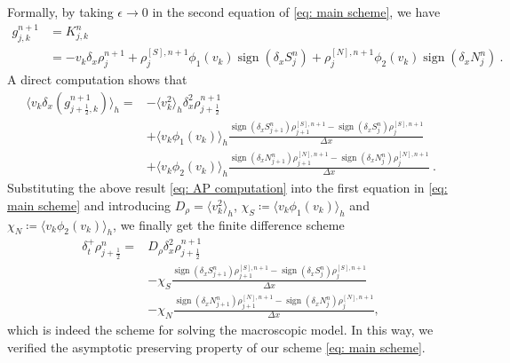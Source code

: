 \documentclass[11pt,twoside]{article}
\theoremstyle{nonumberplain}
\DeclareMathOperator{\sign}{sign}
\begin{document}
{Formally, by taking $\epsilon\to0$ in the second equation of \eqref{eq: main scheme}, we have 
\begin{align*}
    g_{j,k}^{n+1} & = K_{j,k}^n \\
    & = -v_k\delta_x\rho_{j}^{n+1}+
    \rho^{[S],n+1}_{j}\phi_1(v_k) \sign(\delta_x S_j^n) +\rho^{[N],n+1}_{j} \phi_2(v_k) \sign(\delta_x N_j^n)\ .
\end{align*}
A direct computation shows that
\begin{align}
    \langle v_k \delta_x(g_{j+\frac12,k}^{n+1}) \rangle_h = &
    -\langle v_k^2  \rangle_h \delta^2_x \rho_{j+\frac12}^{n+1}\nonumber \\
    &+ \langle v_k \phi_1(v_k) \rangle_h \frac{\sign(\delta_x S_{j+1}^n) \rho^{[S],n+1}_{j+1} - \sign(\delta_x S_{j}^n) \rho^{[S],n+1}_{j}}{\Delta x}\nonumber\\
    &+\langle v_k \phi_2(v_k) \rangle_h \frac{\sign(\delta_x N_{j+1}^n) \rho^{[N],n+1}_{j+1} - \sign(\delta_x N_{j}^n) \rho^{[N],n+1}_{j}}{\Delta x}\ .\label{eq: AP computation}
\end{align}
}
{
Substituting the above result \eqref{eq: AP computation} into the first equation in  \eqref{eq: main scheme} and introducing $D_\rho=\langle v_k^2\rangle_h$, 
$\chi_S \coloneqq \langle v_k \phi_1(v_k) \rangle_h$ and 
$\chi_N \coloneqq \langle v_k \phi_2(v_k) \rangle_h$, 
we finally get the finite difference scheme 
\begin{align*}
    \delta_t^+\rho_{j+\frac{1}{2}}^n = &D_\rho \delta_x^2 \rho_{j+\frac12}^{n+1} \\
    &- \chi_S \frac{\sign(\delta_x S_{j+1}^n) \rho^{[S],n+1}_{j+1} - \sign(\delta_x S_{j}^n) \rho^{[S],n+1}_{j}}{\Delta x} \\
    &- \chi_N \frac{\sign(\delta_x N_{j+1}^n) \rho^{[N],n+1}_{j+1} - \sign(\delta_x N_{j}^n) \rho^{[N],n+1}_{j}}{\Delta x},
\end{align*}
which is indeed the scheme for solving the macroscopic model. 
In this way, we verified the asymptotic preserving property of our scheme \eqref{eq: main scheme}.
}
\end{document}
